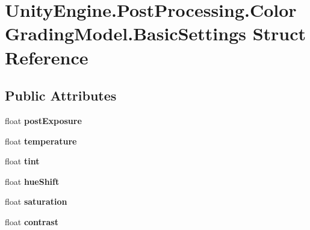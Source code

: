 \hypertarget{struct_unity_engine_1_1_post_processing_1_1_color_grading_model_1_1_basic_settings}{}\section{Unity\+Engine.\+Post\+Processing.\+Color\+Grading\+Model.\+Basic\+Settings Struct Reference}
\label{struct_unity_engine_1_1_post_processing_1_1_color_grading_model_1_1_basic_settings}
\subsection*{Public Attributes}
\begin{DoxyCompactItemize}
\item 
\mbox{\label{struct_unity_engine_1_1_post_processing_1_1_color_grading_model_1_1_basic_settings_a9cb393ec494625e51bce4c9233662f1b}} 
float {\bfseries post\+Exposure}
\item 
\mbox{\label{struct_unity_engine_1_1_post_processing_1_1_color_grading_model_1_1_basic_settings_ab15fdf0aa1ecbfa719238b11ba145e6d}} 
float {\bfseries temperature}
\item 
\mbox{\label{struct_unity_engine_1_1_post_processing_1_1_color_grading_model_1_1_basic_settings_ad08e54fbd8fca3ee7dbf1acb2f466584}} 
float {\bfseries tint}
\item 
\mbox{\label{struct_unity_engine_1_1_post_processing_1_1_color_grading_model_1_1_basic_settings_a54c3256a16904c25bd61eb6644221305}} 
float {\bfseries hue\+Shift}
\item 
\mbox{\label{struct_unity_engine_1_1_post_processing_1_1_color_grading_model_1_1_basic_settings_a1d5874758e0fe2b3f796e787f5a3453f}} 
float {\bfseries saturation}
\item 
\mbox{\label{struct_unity_engine_1_1_post_processing_1_1_color_grading_model_1_1_basic_settings_a44e673c94a8f43d2f832cec5d3adbf7b}} 
float {\bfseries contrast}
\end{DoxyCompactItemize}
